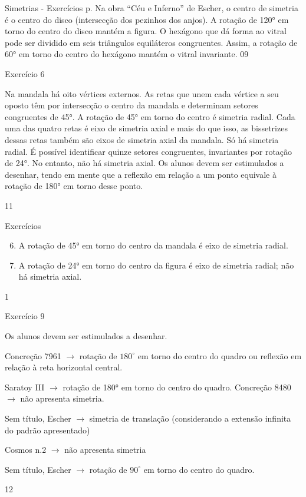\begin{sugestions}{Simetrias - Exercícios p. \pageref{transformacoes-exercise4}}
{
Na obra “Céu e Inferno” de Escher, o centro de simetria é o centro do disco (intersecção dos pezinhos dos anjos). A rotação de 120° em torno do centro do disco mantém a figura. O hexágono que dá forma ao vitral pode ser dividido em seis triângulos equiláteros congruentes. Assim, a rotação de 60° em torno do centro do hexágono mantém o vitral invariante.   
}{0}{9}
\end{sugestions}
\marginpar{\vspace{-1em}}
\begin{sugestions}{Exercício 6}
{
Na mandala há oito vértices externos. As retas que unem cada vértice a seu oposto têm por intersecção o centro da mandala e determinam setores congruentes de 45°. A rotação de 45° em torno do centro é simetria radial. Cada uma das quatro retas é eixo de simetria axial e mais do que isso, as bissetrizes dessas retas também são eixos de simetria axial da mandala.
Só há simetria radial. É possível identificar quinze setores congruentes, invariantes por rotação de 24°. No entanto, não há simetria axial.
Os alunos devem ser estimulados a desenhar, tendo em mente que a reflexão em relação a um ponto equivale à rotação de 180° em torno desse ponto. 

}{1}{1}
\end{sugestions}
\begin{answer}{Exercícios}
{\exerciselist
\begin{enumerate}\setcounter{enumi}{5}
\item A rotação de 45° em torno do centro da mandala é eixo de simetria radial. 
\item A rotação de 24° em torno do centro da figura é eixo de simetria radial; não há simetria axial.
\end{enumerate}
}{1}
\end{answer}
\clearmargin
\begin{sugestions}{Exercício 9}
{
Os alunos devem ser estimulados a desenhar. 


Concreção 7961 $\rightarrow$ rotação de $180^{\circ}$ em torno do centro do quadro ou reflexão em relação à reta horizontal central. 

Saratoy III $\rightarrow$ rotação de 180° em torno do centro do quadro.
Concreção 8480 $\rightarrow$ não apresenta simetria.

Sem título, Escher $\rightarrow$ simetria de translação (considerando a extensão infinita do padrão apresentado)

Cosmos n.2 $\rightarrow$ não apresenta simetria

Sem título, Escher $\rightarrow$ rotação de $90^{\circ}$ em torno do centro do quadro.
}{1}{2}
\end{sugestions}
